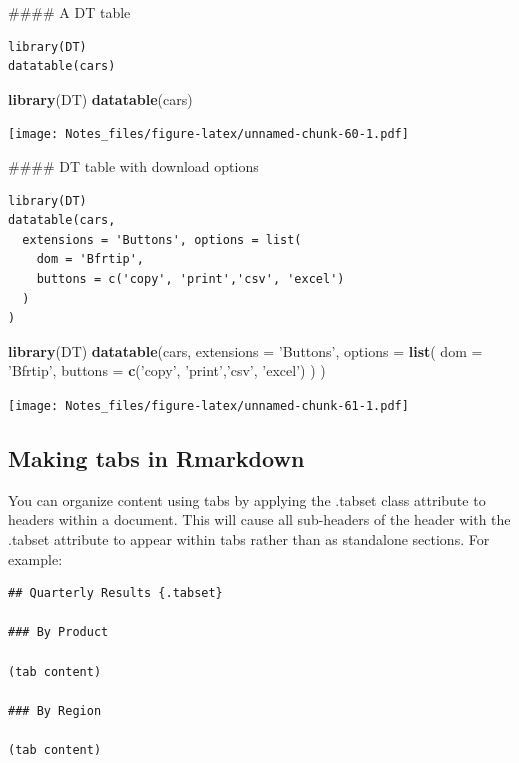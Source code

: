 \documentclass[
]{book}
\newenvironment{Shaded}{\begin{snugshade}}{\end{snugshade}}
\newcommand{\DataTypeTok}[1]{\textcolor[rgb]{0.13,0.29,0.53}{#1}}
\newcommand{\KeywordTok}[1]{\textcolor[rgb]{0.13,0.29,0.53}{\textbf{#1}}}
\newcommand{\NormalTok}[1]{#1}
\newcommand{\StringTok}[1]{\textcolor[rgb]{0.31,0.60,0.02}{#1}}
\begin{document}
\#\#\#\# A DT table

\begin{verbatim}
library(DT)
datatable(cars)
\end{verbatim}

\begin{Shaded}
\begin{Highlighting}[]
\KeywordTok{library}\NormalTok{(DT)}
\KeywordTok{datatable}\NormalTok{(cars)}
\end{Highlighting}
\end{Shaded}

\texttt{[image: Notes\_files/figure-latex/unnamed-chunk-60-1.pdf]}

\#\#\#\# DT table with download options

\begin{verbatim}
library(DT)
datatable(cars,
  extensions = 'Buttons', options = list(
    dom = 'Bfrtip',
    buttons = c('copy', 'print','csv', 'excel')
  )
)
\end{verbatim}

\begin{Shaded}
\begin{Highlighting}[]
\KeywordTok{library}\NormalTok{(DT)}
\KeywordTok{datatable}\NormalTok{(cars,}
           \DataTypeTok{extensions =} \StringTok{'Buttons'}\NormalTok{, }\DataTypeTok{options =} \KeywordTok{list}\NormalTok{(}
    \DataTypeTok{dom =} \StringTok{'Bfrtip'}\NormalTok{,}
    \DataTypeTok{buttons =} \KeywordTok{c}\NormalTok{(}\StringTok{'copy'}\NormalTok{, }\StringTok{'print'}\NormalTok{,}\StringTok{'csv'}\NormalTok{, }\StringTok{'excel'}\NormalTok{)}
\NormalTok{    )}
\NormalTok{)}
\end{Highlighting}
\end{Shaded}

\texttt{[image: Notes\_files/figure-latex/unnamed-chunk-61-1.pdf]}

\hypertarget{making-tabs-in-rmarkdown}{%
\subsection{Making tabs in Rmarkdown}\label{making-tabs-in-rmarkdown}}

You can organize content using tabs by applying the .tabset class attribute to headers within a document. This will cause all sub-headers of the header with the .tabset attribute to appear within tabs rather than as standalone sections. For example:

\begin{verbatim}
## Quarterly Results {.tabset}

### By Product

(tab content)

### By Region

(tab content)
\end{verbatim}
\end{document}
